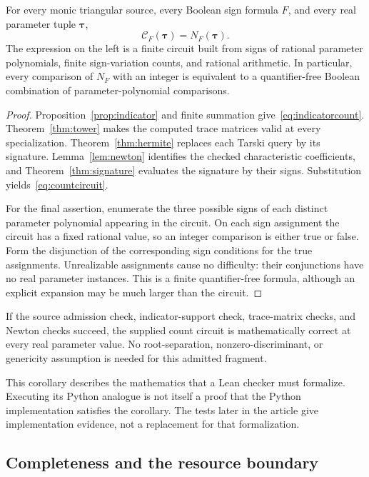 \begin{theorem}\label{thm:main}
For every monic triangular source, every Boolean sign formula $F$, and every real parameter tuple $\bm\tau$,
\[
\mathcal C_F(\bm\tau)=N_F(\bm\tau).
\]
The expression on the left is a finite circuit built from signs of rational parameter polynomials, finite sign-variation counts, and rational arithmetic. In particular, every comparison of $N_F$ with an integer is equivalent to a quantifier-free Boolean combination of parameter-polynomial comparisons.
\end{theorem}
\begin{proof}
Proposition~\ref{prop:indicator} and finite summation give~\eqref{eq:indicatorcount}. Theorem~\ref{thm:tower} makes the computed trace matrices valid at every specialization. Theorem~\ref{thm:hermite} replaces each Tarski query by its signature. Lemma~\ref{lem:newton} identifies the checked characteristic coefficients, and Theorem~\ref{thm:signature} evaluates the signature by their signs. Substitution yields~\eqref{eq:countcircuit}.

For the final assertion, enumerate the three possible signs of each distinct parameter polynomial appearing in the circuit. On each sign assignment the circuit has a fixed rational value, so an integer comparison is either true or false. Form the disjunction of the corresponding sign conditions for the true assignments. Unrealizable assignments cause no difficulty: their conjunctions have no real parameter instances. This is a finite quantifier-free formula, although an explicit expansion may be much larger than the circuit.
\end{proof}

\begin{corollary}
If the source admission check, indicator-support check, trace-matrix checks, and Newton checks succeed, the supplied count circuit is mathematically correct at every real parameter value. No root-separation, nonzero-discriminant, or genericity assumption is needed for this admitted fragment.
\end{corollary}

This corollary describes the mathematics that a Lean checker must formalize. Executing its Python analogue is not itself a proof that the Python implementation satisfies the corollary. The tests later in the article give implementation evidence, not a replacement for that formalization.

\subsection{Completeness and the resource boundary}

